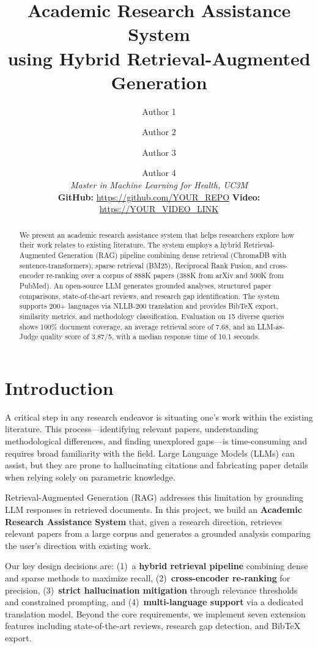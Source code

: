 \documentclass[11pt,a4paper]{article}
\title{\textbf{Academic Research Assistance System\\using Hybrid Retrieval-Augmented Generation}}
\author{
  Author 1 \and Author 2 \and Author 3 \and Author 4 \\
  \textit{Master in Machine Learning for Health, UC3M} \\
  \small \textbf{GitHub:} \url{https://github.com/YOUR_REPO} \quad
  \textbf{Video:} \url{https://YOUR_VIDEO_LINK}
}
\date{}
\begin{document}
\maketitle

\begin{abstract}
We present an academic research assistance system that helps researchers explore how their work relates to existing literature. The system employs a hybrid Retrieval-Augmented Generation (RAG) pipeline combining dense retrieval (ChromaDB with sentence-transformers), sparse retrieval (BM25), Reciprocal Rank Fusion, and cross-encoder re-ranking over a corpus of 888K papers (388K from arXiv and 500K from PubMed). An open-source LLM generates grounded analyses, structured paper comparisons, state-of-the-art reviews, and research gap identification. The system supports 200+ languages via NLLB-200 translation and provides BibTeX export, similarity metrics, and methodology classification. Evaluation on 15 diverse queries shows 100\% document coverage, an average retrieval score of 7.68, and an LLM-as-Judge quality score of 3.87/5, with a median response time of 10.1 seconds.
\end{abstract}

\section{Introduction}

A critical step in any research endeavor is situating one's work within the existing literature. This process---identifying relevant papers, understanding methodological differences, and finding unexplored gaps---is time-consuming and requires broad familiarity with the field. Large Language Models (LLMs) can assist, but they are prone to hallucinating citations and fabricating paper details when relying solely on parametric knowledge.

Retrieval-Augmented Generation (RAG) addresses this limitation by grounding LLM responses in retrieved documents. In this project, we build an \textbf{Academic Research Assistance System} that, given a research direction, retrieves relevant papers from a large corpus and generates a grounded analysis comparing the user's direction with existing work.

Our key design decisions are: (1)~a \textbf{hybrid retrieval pipeline} combining dense and sparse methods to maximize recall, (2)~\textbf{cross-encoder re-ranking} for precision, (3)~\textbf{strict hallucination mitigation} through relevance thresholds and constrained prompting, and (4)~\textbf{multi-language support} via a dedicated translation model. Beyond the core requirements, we implement seven extension features including state-of-the-art reviews, research gap detection, and BibTeX export.
\end{document}
